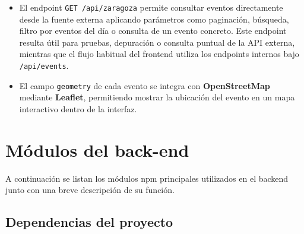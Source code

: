 \documentclass[12pt, a4paper]{article}
\begin{document}
\begin{itemize}[leftmargin=1.4em]
  \item El endpoint \texttt{GET /api/zaragoza} permite consultar eventos directamente
    desde la fuente externa aplicando parámetros como paginación, búsqueda, filtro por
    eventos del día o consulta de un evento concreto. Este endpoint resulta útil para
    pruebas, depuración o consulta puntual de la API externa, mientras que el flujo
    habitual del frontend utiliza los endpoints internos bajo \texttt{/api/events}.

  \item El campo \texttt{geometry} de cada evento se integra con \textbf{OpenStreetMap}
    mediante \textbf{Leaflet}, permitiendo mostrar la ubicación del evento en un mapa
    interactivo dentro de la interfaz.
\end{itemize}

\section{Módulos del back-end}

A continuación se listan los módulos npm principales utilizados en el backend
junto con una breve descripción de su función.

\subsection{Dependencias del proyecto}
\end{document}
